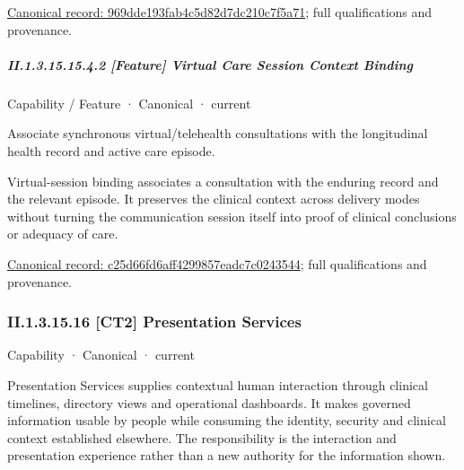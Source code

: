 {\footnotesize \href{../../../../continuum/strategy/capability/feature/969dde193fab4c5d82d7dc210c7f5a71.md}{Canonical record: 969dde193fab4c5d82d7dc210c7f5a71}; full qualifications and provenance.}\par
\subparagraph*{II.1.3.15.15.4.2 [Feature] Virtual Care Session Context Binding}
\label{navigation:II.1.3.15.15.4.2}

\label{element:c25d66fd6aff4299857eadc7c0243544}
{\small Capability / Feature · Canonical · current}\par

Associate synchronous virtual/telehealth consultations with the longitudinal health record and active care episode.



Virtual-session binding associates a consultation with the enduring record and the relevant episode. It preserves the clinical context across delivery modes without turning the communication session itself into proof of clinical conclusions or adequacy of care.


{\footnotesize \href{../../../../continuum/strategy/capability/feature/c25d66fd6aff4299857eadc7c0243544.md}{Canonical record: c25d66fd6aff4299857eadc7c0243544}; full qualifications and provenance.}\par
\subsubsection*{II.1.3.15.16 [CT2] Presentation Services}
\label{navigation:II.1.3.15.16}

\label{element:e9b6ba1917ba44cca7466444d0836c98}
{\small Capability · Canonical · current}\par

Presentation Services supplies contextual human interaction through clinical timelines, directory views and operational dashboards. It makes governed information usable by people while consuming the identity, security and clinical context established elsewhere. The responsibility is the interaction and presentation experience rather than a new authority for the information shown.



